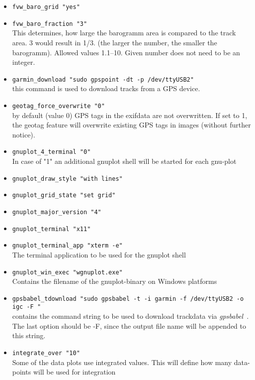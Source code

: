 \begin{itemize}
\item \texttt{fvw\_baro\_grid    "yes"}

\item \texttt{fvw\_baro\_fraction "3"}\\
This determines, how large the barogramm area is compared to the track area.
3 would result in 1/3. (the larger the number, the smaller the barogramm). Allowed values 1.1--10.
Given number does not need to be an integer.

\item \texttt{garmin\_download    "sudo gpspoint -dt -p /dev/ttyUSB2"} \\
this command is used to download tracks from a GPS device.

\item \texttt{geotag\_force\_overwrite    "0"} \\
  by default (value 0) GPS tags in the exifdata are not overwritten. If set to 1, the geotag feature will
overwrite existing GPS tags in images (without further notice).

\item \texttt{gnuplot\_4\_terminal    "0"} \\
 In case of "1" an additional gnuplot shell will be started for each gnu-plot
\item \texttt{gnuplot\_draw\_style    "with lines"}
\item \texttt{gnuplot\_grid\_state    "set grid"}
\item \texttt{gnuplot\_major\_version    "4"}
\item \texttt{gnuplot\_terminal    "x11"}
\item \texttt{gnuplot\_terminal\_app    "xterm -e"}\\
    The terminal application to be used for the gnuplot shell
\item \texttt{gnuplot\_win\_exec    "wgnuplot.exe"}\\
    Contains the filename of the gnuplot-binary on Windows platforms

\item \texttt{gpsbabel\_tdownload  "sudo gpsbabel -t -i garmin -f /dev/ttyUSB2 -o igc -F "}\\
  contains the command string to be used to download trackdata via \emph{gpsbabel}~\cite{gpsbabel}. The last option should be -F, since the output file name will be appended to this string.

\item \texttt{integrate\_over    "10"}\\
    Some of the data plots use integrated values. This will define how many data-points will
    be used for  integration


\end{itemize}
